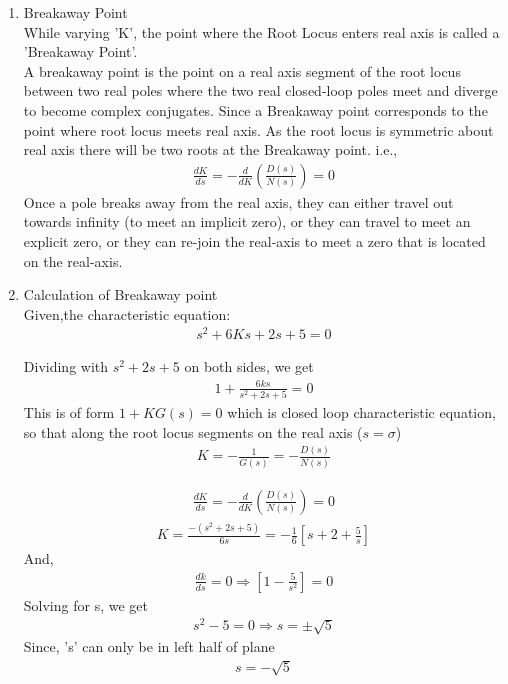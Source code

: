 \begin{enumerate}[label=\thesubsection.\arabic*.,ref=\thesubsection.\theenumi]
\item Breakaway Point \\
    While varying 'K', the point where the Root Locus enters real axis is called a 'Breakaway Point'. \\
A breakaway point is the point on a real axis segment of the root locus between two real poles where the two real closed-loop poles meet and diverge to become complex conjugates. Since a Breakaway point corresponds to the point where root locus meets real axis. As the root locus is symmetric about real axis there will be two roots at the Breakaway point. 
i.e.,
    \begin{align}
        \frac{d K}{d s}=-\frac{d}{d K}\left(\frac{D(s)}{N(s)}\right)=0 
    \end{align}
    Once a pole breaks away from the real axis, they can either travel out towards infinity (to meet an implicit zero), or they can travel to meet an explicit zero, or they can re-join the real-axis to meet a zero that is located on the real-axis. 

\item Calculation of Breakaway point \\

Given,the characteristic equation:
    \begin{align}
        s^2 + 6Ks + 2s + 5 = 0    
    \end{align}
    
    Dividing with $s^2 + 2s + 5$ on both sides, we get
    \begin{align}
        1+\frac{6 k s}{s^{2}+2 s+5}=0    
    \end{align}
    This is of form $1+KG(s)=0$ which is closed loop characteristic equation, so that along the root locus
    segments on the real axis ($s = \sigma$)
    \begin{align}
        K=-\frac{1}{G(s)}=-\frac{D(s)}{N(s)}    
    \end{align}

    \begin{align}
        \frac{d K}{d s}=-\frac{d}{d K}\left(\frac{D(s)}{N(s)}\right)=0    
    \end{align}
    \begin{align}
        K=\frac{-\left(s^{2}+2 s+5\right)}{6 s}=-\frac{1}{6}\left[s+2+\frac{5}{s}\right]    
    \end{align}
    And,
    \begin{align}
        \frac{d k}{d s}=0 \Rightarrow\left[1-\frac{5}{s^{2}}\right]=0 
    \end{align}
    Solving for s, we get
    \begin{align}
        s^{2}-5=0 \Rightarrow s=\pm \sqrt{5}    
    \end{align}
    Since, 's' can only be in left half of plane
    \begin{align}
        \boxed{s=-\sqrt{5}}    
    \end{align}
    

\end{enumerate}

